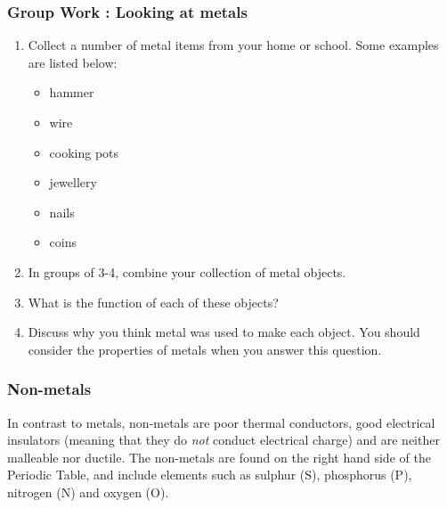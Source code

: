             \subsubsection{  Group Work : Looking at metals
        }
            \nopagebreak
        \label{m38708*id65869}\begin{enumerate}[noitemsep, label=\textbf{\arabic*}. ] 
            \label{m38708*uid83}\item Collect a number of metal items from your home or school. Some examples are listed below:
\label{m38708*id65885}\begin{itemize}[noitemsep]
            \label{m38708*uid84}\item hammer
\label{m38708*uid85}\item wire
\label{m38708*uid86}\item cooking pots
\label{m38708*uid87}\item jewellery
\label{m38708*uid88}\item nails
\label{m38708*uid89}\item coins
\end{itemize}
        \label{m38708*uid90}\item In groups of 3-4, combine your collection of metal objects.
\label{m38708*uid91}\item What is the function of each of these objects?
\label{m38708*uid92}\item Discuss why you think metal was used to make each object. You should consider the properties of metals when you answer this question.
\end{enumerate}
      \label{m38708*uid93}
            \subsubsection{ Non-metals}
            \nopagebreak
        \label{m38708*id66021}In contrast to metals, non-metals are poor thermal conductors, good electrical insulators (meaning that they do \textsl{not} conduct electrical charge) and are neither malleable nor ductile. The non-metals are found on the right hand side of the Periodic Table, and include elements such as sulphur ($\mathrm{S}$), phosphorus ($\mathrm{P}$), nitrogen ($\mathrm{N}$) and oxygen ($\mathrm{O}$).\par 
      \label{m38708*uid94}

